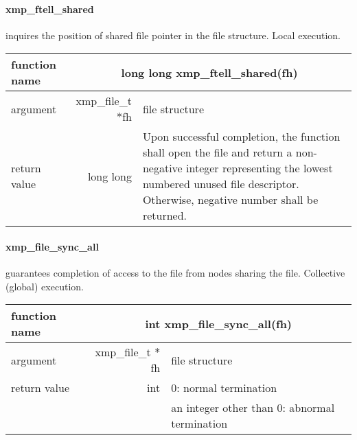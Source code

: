    \paragraph{xmp\_ftell\_shared} inquires the position of shared file pointer in the file structure. Local execution.

   \begin{table}[h]
    \begin{center}
     \begin{tabular}{|l|r|p{80mm}|}
      \hline
      {\bf function name}  & \multicolumn{2}{c|}{\bf long long
      xmp\_ftell\_shared(fh)} \\ \hline \hline
      argument & xmp\_file\_t $*$fh & file structure \\ \hline
      return value & long long & Upon successful completion, the
	      function shall open the file and return a non-negative
	      integer representing the lowest numbered unused file
	      descriptor. Otherwise, negative number shall be
	      returned. \\ \hline
      \end{tabular}
     \end{center}
    \label{tb:aaa}
   \end{table}
   
   \paragraph{xmp\_file\_sync\_all} guarantees completion of access to the file from nodes sharing the file.
   Collective (global) execution.

   \begin{table}[h]
    \begin{center}
     \begin{tabular}{|l|r|p{80mm}|}
      \hline
      {\bf function name}  & \multicolumn{2}{c|}{\bf int
      xmp\_file\_sync\_all(fh)} \\ \hline \hline
      argument & xmp\_file\_t $*$fh & file structure \\ \hline
      return value & int & 0: normal termination \\
      &  & an integer other than 0: abnormal termination \\ \hline
      \end{tabular}
     \end{center}
    \label{tb:aaa}
   \end{table}

   \clearpage

